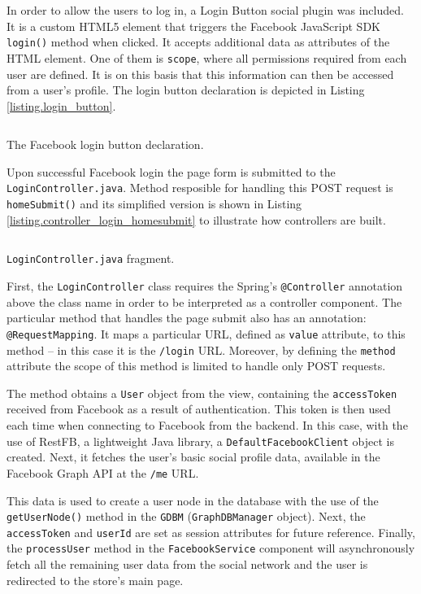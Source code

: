 \documentclass[12pt]{report}
\begin{document}
In order to allow the users to log in, a Login Button social plugin was included. It is a custom HTML5 element that triggers the Facebook JavaScript SDK \texttt{login()} method when clicked. It accepts additional data as attributes of the HTML element. One of them is \texttt{scope}, where all permissions required from each user are defined. It is on this basis that this information can then be accessed from a user's profile. The login button declaration is depicted in Listing \ref{listing.login_button}.

\begin{listing}
\inputminted[frame=lines,framesep=3mm]{html}{code_login_button.html}
\caption{The Facebook login button declaration.}
\label{listing.login_button}
\end{listing}

Upon successful Facebook login the page form is submitted to the \texttt{Login\-Controller.java}. Method resposible for handling this POST request is \texttt{home\-Submit()} and its simplified version is shown in Listing \ref{listing.controller_login_homesubmit} to illustrate how controllers are built.

\begin{listing}[!t]
\inputminted[frame=lines,framesep=3mm]{java}{code_controller_login.java}
\caption{\texttt{LoginController.java} fragment.}
\label{listing.controller_login_homesubmit}
\end{listing}

First, the \texttt{LoginController} class requires the Spring's \texttt{@Controller} annotation above the class name in order to be interpreted as a controller component. The particular method that handles the page submit also has an annotation: \texttt{@Request\-Mapping}. It maps a particular URL, defined as \texttt{value} attribute, to this method -- in this case it is the \texttt{/login} URL. Moreover, by defining the \texttt{method} attribute the scope of this method is limited to handle only POST requests.

The method obtains a \texttt{User} object from the view, containing the \texttt{access\-Token} received from Facebook as a result of authentication. This token is then used each time when connecting to Facebook from the backend. In this case, with the use of RestFB, a lightweight Java library, a \texttt{Default\-Facebook\-Client} object is created. Next, it fetches the user's basic social profile data, available in the Facebook Graph API at the \texttt{/me} URL.

This data is used to create a user node in the database with the use of the \texttt{getUserNode()} method in the \texttt{GDBM} (\texttt{Graph\-DB\-Manager} object). Next, the \texttt{access\-Token} and \texttt{userId} are set as session attributes for future reference. Finally, the \texttt{process\-User} method in the \texttt{Facebook\-Service} component will asynchronously fetch all the remaining user data from the social network and the user is redirected to the store's main page.
\end{document}
